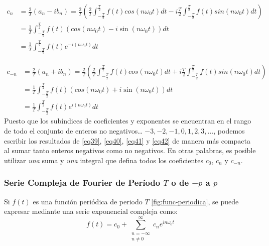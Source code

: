 \begin{equation} \label{eq41}
	\begin{split}
		c_n &= \frac{2}{T} \left(a_n - i b_n\right) = \frac{2}{T} \left(\frac{2}{T} \int_{-\frac{T}{2}}^{\frac{T}{2}} f(t) cos(n\omega_0 t)  dt - i \frac{T}{2} \int_{-\frac{T}{2}}^{\frac{T}{2}} f(t) sin(n\omega_0 t) dt\right) \\
		&=  \frac{1}{T} \int_{-\frac{T}{2}}^{\frac{T}{2}} f(t) \left( cos(n\omega_0 t)  - i \sin (n\omega_0 t)  \right) dt \\
		&= \frac{1}{T} \int_{-\frac{T}{2}}^{\frac{T}{2}} f(t) e^{-i (n\omega_0 t)}  dt		
	\end{split}
\end{equation}

\begin{equation} \label{eq42}
	\begin{split}
		c_{-n} &= \frac{2}{T} \left(a_n + i b_n\right) = \frac{2}{T} \left(\frac{2}{T} \int_{-\frac{T}{2}}^{\frac{T}{2}} f(t) cos(n\omega_0 t)  dt + i \frac{T}{2} \int_{-\frac{T}{2}}^{\frac{T}{2}} f(t) sin(n\omega_0 t) dt\right) \\
		&=  \frac{1}{T} \int_{-\frac{T}{2}}^{\frac{T}{2}} f(t) \left( cos(n\omega_0 t)  + i \sin (n\omega_0 t)  \right) dt \\
		&= \frac{1}{T} \int_{-\frac{T}{2}}^{\frac{T}{2}} f(t) e^{i (n\omega_0 t)}  dt		
	\end{split}
\end{equation}
Puesto que los subíndices de coeficientes y exponentes se encuentran en el rango de todo el conjunto de enteros no negativos… $-3, -2, -1, 0, 1, 2, 3, \dots$, podemos escribir los resultados de \eqref{eq39}, \eqref{eq40}, \eqref{eq41} y \eqref{eq42} de manera más compacta al sumar tanto enteros negativos como no negativos. En otras palabras, es posible utilizar \textit{una} suma y \textit{una} integral que defina todos los coeficientes $c_0$, $c_n$ y $c_{-n}$. ~\cite{matesAvanzadasZill}


\subsubsection{Serie Compleja de Fourier de Período $T$ o de $-p$ a $p$}
Si $f(t)$ es una función periódica de periodo $T$ \ref{fig:func-periodica}, se puede expresar mediante una serie exponencial compleja como: ~\cite{fourierHsu}
\begin{equation}\label{eq45}
	f(t) = c_0 + \sum_{\substack{n=-\infty \\ n \neq 0}}^{\infty} c_n e^{i n \omega_0 t}
\end{equation}



